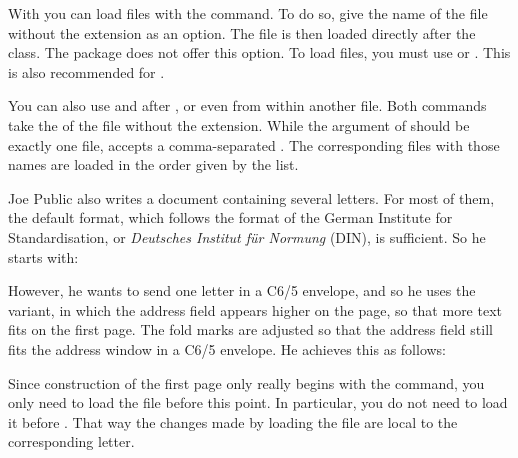 \begin{Declaration}
\end{Declaration}
With  you can load  files
with the  command. To do so, give the name of the
 file without the extension as an option. The
 file is then loaded directly after the class. The
 package does not offer this option.
To load  files, you must use  or
.
This is also recommended for .

You can also use  and  after
, or even from within another 
file. Both commands take the  of the  file without the
extension. While the argument of  should be exactly
one  file,  accepts a comma-separated
. The corresponding  files with those names are
loaded in the order given by the list.
\begin{Example}
  Joe Public also writes a document containing several letters. For most of
  them, the default format, which follows the format of the German Institute
  for Standardisation, or \emph{Deutsches Institut f\"{u}r Normung} (DIN), is
  sufficient. So he starts with:
  However, he wants to send one letter in a C6/5 envelope, and so he
  uses the  variant, in which the
  address field appears higher on the page, so that more text
  fits on the first page. The fold marks are adjusted so that the
  address field still fits the address window in a C6/5 envelope.
  He achieves this as follows:
  Since construction of the first page only really begins with the
   command, you only need to
  load the  file before this point. In particular, you do not need
  to load it before . That way the changes
  made by loading the  file are local to the corresponding letter.
\end{Example}

